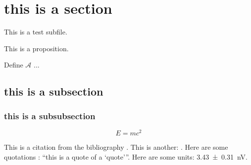 \documentclass[../main.tex]{subfiles} %
\begin{document}
\section{this is a section}
This is a test subfile.

\begin{proposition}
	This is a proposition.
\end{proposition}
\begin{definition}
	Define $\mathscr{A}$ ...
\end{definition}
\subsection{this is a subsection}
\subsubsection{this is a subsubsection}
\begin{equation}
	E = m c^2
\end{equation}

This is a citation from the bibliography \cite{haskell}.
This is another: \cite{quantum_optics}.
Here are some quotations : \enquote{this is a quote of a \enquote{quote}}.
Here are some units: \SI{3.43 \pm 0.31}{\nano \volt}.
\end{document}
